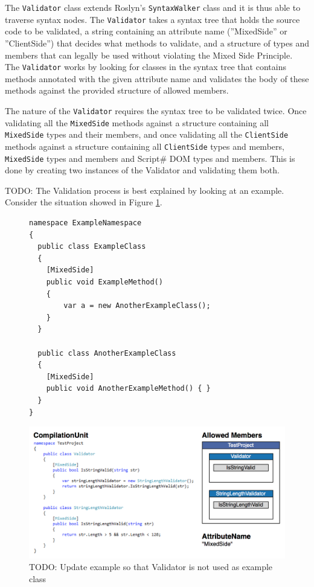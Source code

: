 The \texttt{Validator} class extends Roslyn's \texttt{SyntaxWalker} class and it is thus able to traverse syntax nodes. The \texttt{Validator} takes a syntax tree that holds the source code to be validated, a string containing an attribute name (''MixedSide'' or ''ClientSide'') that decides what methods to validate, and a structure of types and members that can legally be used without violating the Mixed Side Principle. The \texttt{Validator} works by looking for classes in the syntax tree that contains methods annotated with the given attribute name and validates the body of these methods against the provided structure of allowed members.

The nature of the \texttt{Validator} requires the syntax tree to be validated twice. Once validating all the \texttt{MixedSide} methods against a structure containing all \texttt{MixedSide} types and their members, and once validating all the \texttt{ClientSide} methods against a structure containing all \texttt{ClientSide} types and members, \texttt{MixedSide} types and members and Script\# DOM types and members. This is done by creating two instances of the Validator and validating them both.

TODO: The Validation process is best explained by looking at an example. Consider the situation showed in Figure \ref{fig:mixedSideValidationExample}. 

\begin{figure}[H]
	\begin{lstlisting}[language=CSharp,classoffset=1,morekeywords={ExampleClass,AnotherExampleClass,MixedSide}]
namespace ExampleNamespace
{
  public class ExampleClass
  {
  	[MixedSide]
  	public void ExampleMethod()
  	{
  		var a = new AnotherExampleClass();
  	}
  }
  
  public class AnotherExampleClass
  {
  	[MixedSide]
  	public void AnotherExampleMethod() { }
  }
}
	\end{lstlisting}
\end{figure}




\begin{figure}[H]
	\begin{center}
		\centerline{\includegraphics[width=14cm]{resources/images/MixedSideValidationExample.png}}
	\end{center}
	\caption{TODO: Update example so that Validator is not used as example class}
	\label{fig:mixedSideValidationExample}
\end{figure}		

